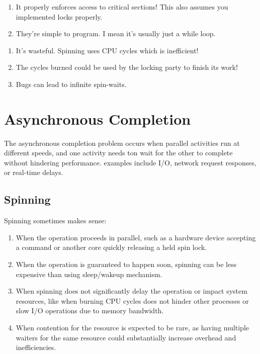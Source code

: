 \documentclass{report}
\begin{document}
\begin{tcbraster}[raster columns=2, raster equal height, raster force size=false]
  \begin{tcolorbox}[colback=green!5!white,colframe=black!75!green,title=Advantages]
    \begin{enumerate}[label=\textit{(\roman*)}]
    \item It properly enforces access to critical sections! This also assumes you implemented locks
      properly.
    \item They're simple to program. I mean it's usually just a while loop.
    \end{enumerate}
  \end{tcolorbox}
  \begin{tcolorbox}[colback=red!5!white,colframe=black!40!red,title=Disadvantages]
    \begin{enumerate}[label=\textit{(\roman*)}]
    \item It's wasteful. Spinning uses CPU cycles which is inefficient!
    \item The cycles burned could be used by the locking party to finish its work!
    \item Bugs can lead to infinite spin-waits.
    \end{enumerate}
  \end{tcolorbox}
\end{tcbraster}


\section{Asynchronous Completion}
The asynchronous completion problem occurs when parallel activities run at different speeds, and one
activity needs ton wait for the other to complete without hindering performance. examples include
I/O, network request responses, or real-time delays.


\subsection{Spinning}
Spinning sometimes makes sense:

\begin{enumerate}[label=\textit{(\roman*)}]
\item When the operation proceeds in parallel, such as a hardware device accepting a
  command or another core quickly releasing a held spin lock.
\item When the operation is guaranteed to happen soon, spinning can be less expensive than using
  sleep/wakeup mechanism. 
\item When spinning does not significantly delay the operation or impact system resources,
  like when burning CPU cycles does not hinder other processes or slow I/O operations due to memory
  bandwidth.
\item When contention for the resource is expected to be rare, as having multiple waiters for the
  same resource could substantially increase overhead and inefficiencies.
\end{enumerate}
\end{document}
